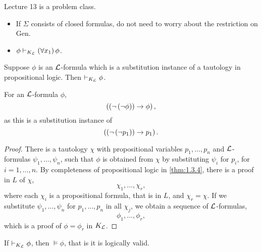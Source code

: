 
Lecture 13 is a problem class.


\begin{remark}
\hfill
\begin{itemize}
\item If $ \Sigma $ consists of closed formulas, do not need to worry about the restriction on Gen.
\item $ \phi \vdash_{K_{\mathcal{L}}} \left( \forall x_1 \right)\phi $.
\end{itemize}
\end{remark}

\begin{theorem}
\label{thm:2.4.4}
Suppose $ \phi $ is an $ \mathcal{L} $-formula which is a substitution instance of a tautology in propositional logic. Then $ \vdash_{K_{\mathcal{L}}} \phi $.
\end{theorem}

\begin{example*}
For an $ \mathcal{L} $-formula $ \phi $,
$$ \left( \left( \neg \left( \neg \phi \right) \right) \rightarrow \phi \right), $$
as this is a substitution instance of
$$ \left( \left( \neg \left( \neg p_1 \right) \right) \rightarrow p_1 \right). $$
\end{example*}

\begin{proof}
There is a tautology $ \chi $ with propositional variables $ p_1, \dots, p_n $ and $ \mathcal{L} $-formulas $ \psi_1, \dots, \psi_n $, such that $ \phi $ is obtained from $ \chi $ by substituting $ \psi_i $ for $ p_i $, for $ i = 1, \dots, n $. By completeness of propositional logic in \ref{thm:1.3.4}, there is a proof in $ L $ of $ \chi $,
$$ \chi_1, \dots, \chi_r, $$
where each $ \chi_i $ is a propositional formula, that is in $ L $, and $ \chi_r = \chi $. If we substitute $ \psi_1, \dots, \psi_n $ for $ p_1, \dots, p_n $ in all $ \chi_j $, we obtain a sequence of $ \mathcal{L} $-formulas,
$$ \phi_1, \dots, \phi_r, $$
which is a proof of $ \phi = \phi_r $ in $ K_\LL $.
\end{proof}

\begin{theorem}[Soundness of $ K_\LL $]
If $ \vdash_{K_{\mathcal{L}}} \phi $, then $ \vDash \phi $, that is it is logically valid.
\end{theorem}

